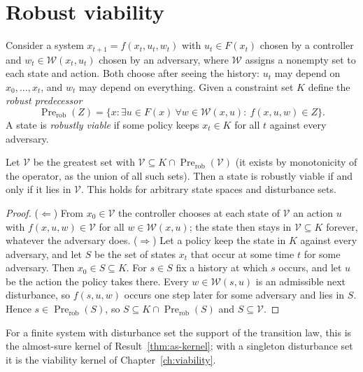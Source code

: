 \section{Robust viability}

Consider a system $x_{t+1}=f(x_t,u_t,w_t)$ with $u_t\in F(x_t)$ chosen by a controller and $w_t\in\mathcal W(x_t,u_t)$ chosen by an adversary, where $\mathcal W$ assigns a nonempty set to each state and action. Both choose after seeing the history: $u_t$ may depend on $x_0,\dots,x_t$, and $w_t$ may depend on everything. Given a constraint set $K$ define the \emph{robust predecessor}
\[
\operatorname{Pre}_{\mathrm{rob}}(Z)=\{x:\exists u\in F(x)\ \forall w\in\mathcal W(x,u):\ f(x,u,w)\in Z\}.
\]
A state is \emph{robustly viable} if some policy keeps $x_t\in K$ for all $t$ against every adversary.

\begin{newresult}\label{thm:robust-kernel}
Let $\mathcal V$ be the greatest set with $\mathcal V\subseteq K\cap\operatorname{Pre}_{\mathrm{rob}}(\mathcal V)$ (it exists by monotonicity of the operator, as the union of all such sets). Then a state is robustly viable if and only if it lies in $\mathcal V$. This holds for arbitrary state spaces and disturbance sets.
\end{newresult}
\begin{proof}
($\Leftarrow$) From $x_0\in\mathcal V$ the controller chooses at each state of $\mathcal V$ an action $u$ with $f(x,u,w)\in\mathcal V$ for all $w\in\mathcal W(x,u)$; the state then stays in $\mathcal V\subseteq K$ forever, whatever the adversary does. ($\Rightarrow$) Let a policy keep the state in $K$ against every adversary, and let $S$ be the set of states $x_t$ that occur at some time $t$ for some adversary. Then $x_0\in S\subseteq K$. For $s\in S$ fix a history at which $s$ occurs, and let $u$ be the action the policy takes there. Every $w\in\mathcal W(s,u)$ is an admissible next disturbance, so $f(s,u,w)$ occurs one step later for some adversary and lies in $S$. Hence $s\in\operatorname{Pre}_{\mathrm{rob}}(S)$, so $S\subseteq K\cap\operatorname{Pre}_{\mathrm{rob}}(S)$ and $S\subseteq\mathcal V$.
\end{proof}

For a finite system with disturbance set the support of the transition law, this is the almost-sure kernel of Result~\ref{thm:as-kernel}; with a singleton disturbance set it is the viability kernel of Chapter~\ref{ch:viability}.

